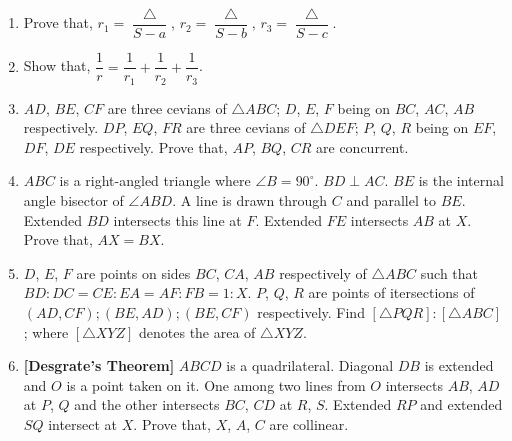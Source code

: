 \documentclass[11pt, a4paper]{article}
\begin{document}
\begin{enumerate}
	\item Prove that, $r_1 = \dfrac{\bigtriangleup}{S-a}$, $r_2 = \dfrac{\bigtriangleup}{S-b}$, $r_3 = \dfrac{\bigtriangleup}{S-c}$.
	
	\item Show that, $\dfrac{1}{r} = \dfrac{1}{r_1} + \dfrac{1}{r_2} + \dfrac{1}{r_3}$.
	
	\item $AD$, $BE$, $CF$ are three cevians of $\bigtriangleup ABC$; $D$, $E$, $F$ being on $BC$, $AC$, $AB$ respectively. $DP$, $EQ$, $FR$ are three cevians of $\bigtriangleup DEF$; $P$, $Q$, $R$ being on $EF$, $DF$, $DE$ respectively. Prove that, $AP$, $BQ$, $CR$ are concurrent.
	
	\item $ABC$ is a right-angled triangle where $\angle B = 90^{\circ}$. $BD \perp AC$. $BE$ is the internal angle bisector of $\angle ABD$. A line is drawn through $C$ and parallel to $BE$. Extended $BD$ intersects this line at $F$. Extended $FE$ intersects $AB$ at $X$. Prove that, $AX = BX$.
	
	\item $D$, $E$, $F$ are points on sides $BC$, $CA$, $AB$ respectively of $\bigtriangleup ABC$ such that $BD : DC = CE : EA = AF : FB = 1 : X$. $P$, $Q$, $R$ are points of itersections of $(AD, CF);(BE, AD);(BE,CF)$ respectively. Find $[\bigtriangleup PQR] : [\bigtriangleup ABC]$; where $[\bigtriangleup XYZ]$ denotes the area of $\bigtriangleup XYZ$.
	
	\item \textbf{[Desgrate's Theorem]} $ABCD$ is a quadrilateral. Diagonal $DB$ is extended and $O$ is a point taken on it. One among two lines from $O$ intersects $AB$, $AD$ at $P$, $Q$ and the other intersects $BC$, $CD$ at $R$, $S$. Extended $RP$ and extended $SQ$ intersect at $X$. Prove that, $X$, $A$, $C$ are collinear.
	

\end{enumerate}
\end{document}
